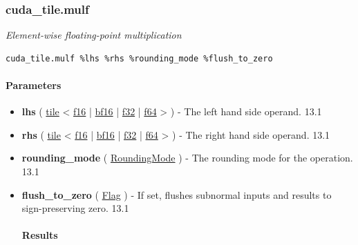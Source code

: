 \documentclass{article}
\begin{document}
\subsubsection{cuda\_tile.mulf}

\textit{Element-wise floating-point multiplication}


\begin{lstlisting}
cuda_tile.mulf %lhs %rhs %rounding_mode %flush_to_zero
\end{lstlisting}

\paragraph{Parameters}

\begin{itemize}
\item \textbf{lhs} ( \href{https://docs.nvidia.com/cuda/tile-ir/latest/sections/types.html#type-tile}{tile} < \href{https://docs.nvidia.com/cuda/tile-ir/latest/sections/types.html#subsection-element-types}{f16} | \href{https://docs.nvidia.com/cuda/tile-ir/latest/sections/types.html#subsection-element-types}{bf16} | \href{https://docs.nvidia.com/cuda/tile-ir/latest/sections/types.html#subsection-element-types}{f32} | \href{https://docs.nvidia.com/cuda/tile-ir/latest/sections/types.html#subsection-element-types}{f64} > ) - The left hand side operand. 13.1
\item \textbf{rhs} ( \href{https://docs.nvidia.com/cuda/tile-ir/latest/sections/types.html#type-tile}{tile} < \href{https://docs.nvidia.com/cuda/tile-ir/latest/sections/types.html#subsection-element-types}{f16} | \href{https://docs.nvidia.com/cuda/tile-ir/latest/sections/types.html#subsection-element-types}{bf16} | \href{https://docs.nvidia.com/cuda/tile-ir/latest/sections/types.html#subsection-element-types}{f32} | \href{https://docs.nvidia.com/cuda/tile-ir/latest/sections/types.html#subsection-element-types}{f64} > ) - The right hand side operand. 13.1
\item \textbf{rounding\_mode} ( \href{https://docs.nvidia.com/cuda/tile-ir/latest/sections/operations.html#op-attribute-cuda-tile-mulf-roundingmode-attr}{RoundingMode} ) - The rounding mode for the operation. 13.1
\item \textbf{flush\_to\_zero} ( \href{https://docs.nvidia.com/cuda/tile-ir/latest/sections/operations.html#type-flag}{Flag} ) - If set, flushes subnormal inputs and results to sign-preserving zero. 13.1


\paragraph{Results}


\end{itemize}
\end{document}
